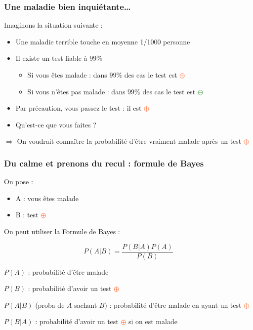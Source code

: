\documentclass[usenames, dvipsnames]{beamer}
\newcommand{\positif}{\textcolor{OrangeRed}{$\oplus$} }
\newcommand{\negatif}{\textcolor{ForestGreen}{$\ominus$} }
\begin{document}
\begin{frame}[plain]
\frametitle{Une maladie bien inquiétante\dots}

Imaginons la situation suivante :

\begin{itemize}
\item Une maladie terrible touche en moyenne 1/1000 personne
\item Il existe un test fiable à $99\%$ \pause
\begin{itemize}
\item Si vous êtes malade : dans $99\%$ des cas le test est \positif
\item Si vous n'êtes pas malade : dans $99\%$ des cas le test est \negatif
\end{itemize}
\item Par précaution, vous passez le test : il est \positif \pause
\item Qu'est-ce que vous faites ? \pause
\end{itemize}

$\Rightarrow$ On voudrait connaître la probabilité d'être vraiment malade après un test \positif

\end{frame}

\begin{frame}[plain]
\frametitle{Du calme et prenons du recul : formule de Bayes}

\pause

On pose :

\begin{itemize}
\item A : vous êtes malade
\item B : test \positif
\end{itemize}

\pause

On peut utiliser la \alert{Formule de Bayes} :

\[
P(A|B) = \frac{P(B|A)P(A)}{P(B)}
\]

\pause
$P(A)$ : probabilité d'être malade

$P(B)$ : probabilité d'avoir un test \positif\pause

$P(A|B)$ (proba de $A$ sachant $B$) : probabilité d'être malade en ayant un test \positif\pause

$P(B|A)$ : probabilité d'avoir un test \positif si on est malade \pause

\end{frame}
\end{document}
